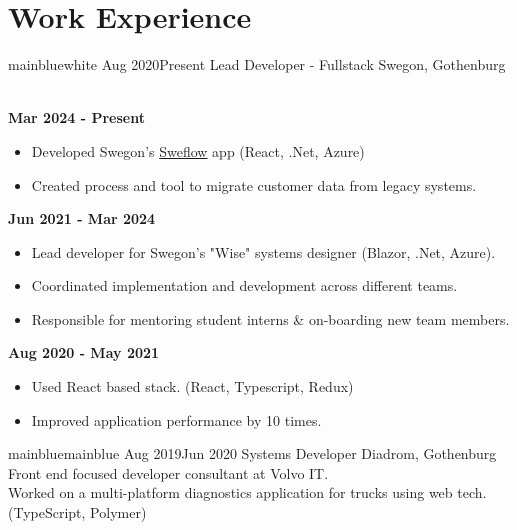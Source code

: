 \documentclass[a4paper]{twentysecondcv} %
\begin{document}
\section{Work Experience}
\begin{twenty} %
    \twentyitemtime
    {mainblue}{white}
    {Aug 2020}{Present}
    {Lead Developer - Fullstack}
    {Swegon, Gothenburg}
    {
    \\
    \textbf{Mar 2024 - Present}
    \begin{itemize}
        \setlength\itemsep{.5em}
        \item Developed Swegon's \href{https://sweflow.swegon.com/}{Sweflow} app (React, .Net, Azure)
        \item Created process and tool to migrate customer data from legacy systems.
    \end{itemize}

    \vspace{1em}

    \textbf{Jun 2021 - Mar 2024}
    \begin{itemize}
        \setlength\itemsep{.5em}
        \item Lead developer for Swegon's "Wise" systems designer (Blazor, .Net, Azure).
        \item Coordinated implementation and development across different teams.
        \item Responsible for mentoring student interns \& on-boarding new team members.
    \end{itemize}
    
    \vspace{1em}
    
    \textbf{Aug 2020 - May 2021}
    \begin{itemize}
        \setlength\itemsep{.5em}
        \item Used React based stack. (React, Typescript, Redux)
        \item Improved application performance by 10 times.
    \end{itemize}
    }
    
    \vspace{.5em}
    
    \twentyitemtime
    {mainblue}{mainblue}
    {Aug 2019}{Jun 2020}
    {Systems Developer}
    {Diadrom, Gothenburg}
    {Front end focused developer consultant at Volvo IT.
    \\ Worked on a multi-platform diagnostics application for trucks using web tech. (TypeScript, Polymer)}
    
    \\
    
    
\end{twenty}
\end{document}
